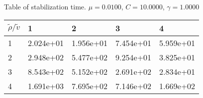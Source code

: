 \begin{center}
	Table of stabilization time. $\mu = 0.0100$, $C = 10.0000$, $\gamma = 1.0000$
	
	\begin{tabular}{|p{0.8in}|p{0.8in}|p{0.8in}|p{0.8in}|p{0.8in}|} \hline
		$\tilde{\rho} / \tilde{v}$ &1 &2 &3 &4 \\ \hline 
		1 &2.024e+01 &1.956e+01 &7.454e+01 &5.959e+01 \\ \hline 
		2 &2.948e+02 &5.477e+02 &9.254e+01 &3.825e+01 \\ \hline 
		3 &8.543e+02 &5.152e+02 &2.691e+02 &2.834e+01 \\ \hline 
		4 &1.691e+03 &7.695e+02 &7.146e+02 &1.669e+02 \\ \hline 
		
	\end{tabular}\\[20pt]
\end{center}
